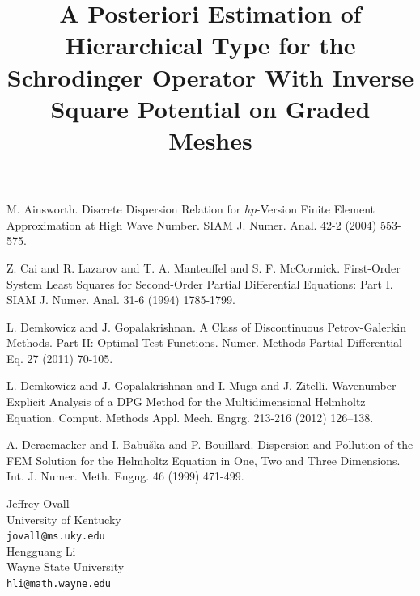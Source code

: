 \documentclass[article,A4,11pt]{llncs}%
\begin{document}

\begin{thebibliography}{10}
{\sc M. Ainsworth}. {Discrete Dispersion Relation for {$hp$}-Version Finite Element Approximation at High Wave Number}. SIAM J. Numer. Anal. 42-2 (2004) 553-575.

{\sc Z. Cai and R. Lazarov and T. A. Manteuffel and S. F. McCormick}. {First-Order System Least Squares for Second-Order Partial Differential Equations: Part I}. SIAM J. Numer. Anal. 31-6 (1994) 1785-1799.

{\sc L. Demkowicz and J. Gopalakrishnan}. {A Class of Discontinuous Petrov-Galerkin Methods. Part II: Optimal Test Functions}. Numer. Methods Partial Differential Eq. 27 (2011) 70-105.

{\sc L. Demkowicz and J. Gopalakrishnan and I. Muga and J. Zitelli}. {Wavenumber Explicit Analysis of a DPG Method for the Multidimensional Helmholtz Equation}. Comput. Methods Appl. Mech. Engrg. 213-216 (2012) 126–138.

{\sc A. Deraemaeker and I. Babu\v{s}ka and P. Bouillard}. {Dispersion and Pollution of the FEM Solution for the Helmholtz Equation in One, Two and Three Dimensions}. Int. J. Numer. Meth. Engng. 46 (1999) 471-499.
\end{thebibliography}

\title{A Posteriori Estimation of Hierarchical Type for the  Schrodinger Operator With Inverse Square Potential on Graded Meshes}
 \author{} \institute{}
\maketitle
\begin{center}
{\large Jeffrey Ovall}\\
University of Kentucky\\
{\tt jovall@ms.uky.edu}
\\ \vspace{4mm}
{\large Hengguang Li}\\
Wayne State University\\
{\tt hli@math.wayne.edu}
\end{center}
\end{document}
